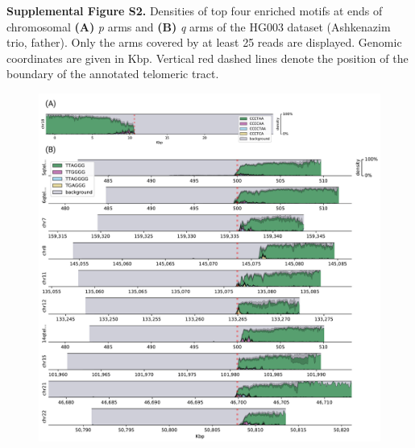 \documentclass{article}
\begin{document}

\noindent \textbf{Supplemental Figure S2.}
Densities of top four enriched motifs at ends of chromosomal \textbf{(A)} \textit{p} arms and \textbf{(B)} \textit{q} arms of the HG003 dataset (Ashkenazim trio, father).
Only the arms covered by at least 25 reads are displayed.
Genomic coordinates are given in Kbp.
Vertical red dashed lines denote the position of the boundary of the annotated telomeric tract.

\begin{figure}[h] \centering
\includegraphics[width=\textwidth,keepaspectratio]{renders/figures/Figure-S2.pdf}
\end{figure}
\end{document}
